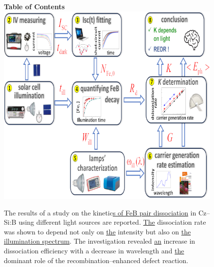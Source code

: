 \documentclass{WileyMSP-template}
\begin{document}




%
%
\begin{figure}
\textbf{Table of Contents}\\
\medskip
  \includegraphics{toc-image.png}
  \medskip
  \caption*{The results of a study on the kinetic\textcolor[rgb]{0.00,0.07,1.00}{\uline{s of FeB pair dissociation}} in Cz--Si:B using different light sources are reported.
  \textcolor[rgb]{0.00,0.07,1.00}{\uline{The}} dissociation rate was shown to depend not only on \textcolor[rgb]{0.00,0.07,1.00}{\uline{the}} intensity but also on
  \textcolor[rgb]{0.00,0.07,1.00}{\uline{the illumination spectrum}}.
  The investigation revealed \textcolor[rgb]{0.00,0.07,1.00}{\uline{an}} increase in dissociation efficiency with a decrease in wavelength and
  \textcolor[rgb]{0.00,0.07,1.00}{\uline{the}} dominant role of the recombination--enhanced defect reaction.}
\end{figure}
\end{document}
